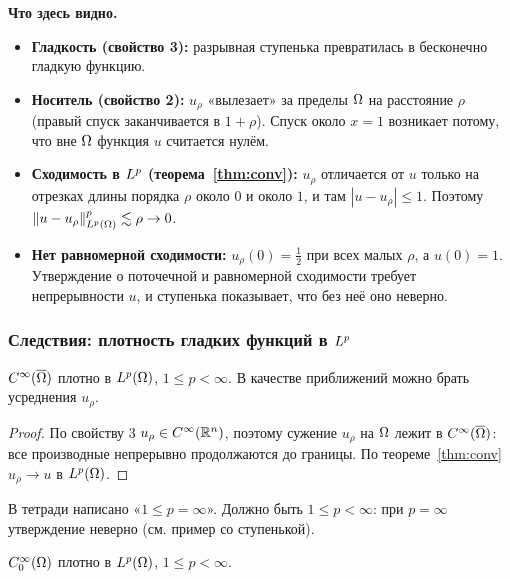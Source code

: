\begin{idea}
\textbf{Что здесь видно.}
\begin{itemize}
  \item \textbf{Гладкость (свойство 3):} разрывная ступенька превратилась в бесконечно
        гладкую функцию.
  \item \textbf{Носитель (свойство 2):} $u_\rho$ «вылезает» за пределы $\Omega$ на расстояние
        $\rho$ (правый спуск заканчивается в $1 + \rho$). Спуск около $x = 1$ возникает
        потому, что вне $\Omega$ функция $u$ считается нулём.
  \item \textbf{Сходимость в $L^{p}$ (теорема~\ref{thm:conv}):} $u_\rho$ отличается от $u$
        только на отрезках длины порядка $\rho$ около $0$ и около $1$, и там
        $|u - u_\rho| \le 1$. Поэтому $\left\lVert u - u_\rho \right\rVert^p_{L^{p}(\Omega)} \lesssim \rho \to 0$.
  \item \textbf{Нет равномерной сходимости:} $u_\rho(0) = \tfrac12$ при всех малых $\rho$,
        а $u(0) = 1$. Утверждение о поточечной и равномерной сходимости требует
        непрерывности $u$, и ступенька показывает, что без неё оно неверно.
\end{itemize}
\end{idea}


\subsubsection*{Следствия: плотность гладких функций в $L^{p}$}

\begin{corollary}\label{cor:dense-smooth}
$C^\infty(\overline{\Omega})$ плотно в $L^{p}(\Omega)$, $1 \le p < \infty$. В качестве приближений можно
брать усреднения $u_\rho$.
\end{corollary}

\begin{proof}
По свойству 3 $u_\rho \in C^\infty(\mathbb{R}^n)$, поэтому сужение $u_\rho$ на $\Omega$ лежит
в $C^\infty(\overline{\Omega})$: все производные непрерывно продолжаются до границы.
По теореме~\ref{thm:conv} $u_\rho \to u$ в $L^{p}(\Omega)$.
\end{proof}

\begin{warn}
В тетради написано «$1 \le p = \infty$». Должно быть $1 \le p < \infty$: при $p = \infty$
утверждение неверно (см. пример со ступенькой).
\end{warn}

\begin{corollary}\label{cor:dense-c0}
$C_0^\infty(\Omega)$ плотно в $L^{p}(\Omega)$, $1 \le p < \infty$.
\end{corollary}

